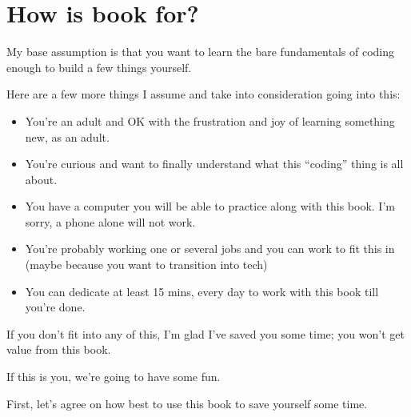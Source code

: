 \section{How is book for?}\label{sec:how-is-book-for?}
My base assumption is that you want to learn the bare fundamentals of coding enough to build a few things yourself.

Here are a few more things I assume and take into consideration going into this:
\begin{itemize}
    \item You're an adult and OK with the frustration and joy of learning something new, as an adult.
    \item You're curious and want to finally understand what this ``coding'' thing is all about.
    \item You have a computer you will be able to practice along with this book.
    I'm sorry, a phone alone will not work.
    \item You're probably working one or several jobs and you can work to fit this in
    (maybe because you want to transition into tech)
    \item You can dedicate at least 15 mins, every day to work with this book till you're done.
\end{itemize}

If you don't fit into any of this, I'm glad I've saved you some time; you won't get value from this book.

If this is you, we're going to have some fun.

First, let's agree on how best to use this book to save yourself some time.

